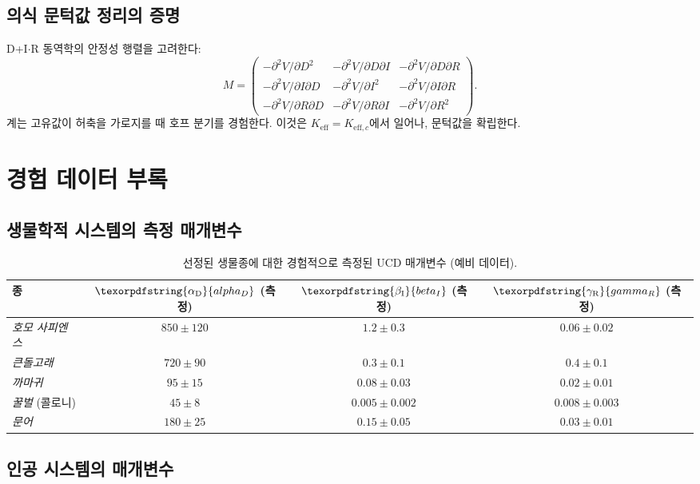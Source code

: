 \documentclass[11pt,a4paper]{article}
\DeclareRobustCommand{\alD}{\texorpdfstring{\ensuremath{\alpha_{\mathrm{D}}}}{alpha_D}}
\DeclareRobustCommand{\beI}{\texorpdfstring{\ensuremath{\beta_{\mathrm{I}}}}{beta_I}}
\DeclareRobustCommand{\gaR}{\texorpdfstring{\ensuremath{\gamma_{\mathrm{R}}}}{gamma_R}}
\newcommand{\eff}{\mathrm{eff}}
\newcommand{\Ke}{K_{\eff}}
\newcommand{\Kec}{K_{\eff,c}}
\begin{document}
	\subsection{의식 문턱값 정리의 증명}
	
	D+I\(\cdot\)R 동역학의 안정성 행렬을 고려한다:
	\[
	M = \begin{pmatrix}
		-\partial^2 V/\partial D^2 & -\partial^2 V/\partial D\partial I & -\partial^2 V/\partial D\partial R \\
		-\partial^2 V/\partial I\partial D & -\partial^2 V/\partial I^2 & -\partial^2 V/\partial I\partial R \\
		-\partial^2 V/\partial R\partial D & -\partial^2 V/\partial R\partial I & -\partial^2 V/\partial R^2
	\end{pmatrix}.
	\]
	계는 고유값이 허축을 가로지를 때 호프 분기를 경험한다. 이것은 \(\Ke = \Kec\)에서 일어나, 문턱값을 확립한다.
	
	\section{경험 데이터 부록}
	
	\subsection{생물학적 시스템의 측정 매개변수}
	
	\begin{table}[ht]
		\centering
		\begin{tabular}{lccc}
			\toprule
			\textbf{종} & \(\alD\) (측정) & \(\beI\) (측정) & \(\gaR\) (측정) \\
			\midrule
			\textit{호모 사피엔스} & \(850 \pm 120\) & \(1.2 \pm 0.3\) & \(0.06 \pm 0.02\) \\
			\textit{큰돌고래} & \(720 \pm 90\) & \(0.3 \pm 0.1\) & \(0.4 \pm 0.1\) \\
			\textit{까마귀} & \(95 \pm 15\) & \(0.08 \pm 0.03\) & \(0.02 \pm 0.01\) \\
			\textit{꿀벌} (콜로니) & \(45 \pm 8\) & \(0.005 \pm 0.002\) & \(0.008 \pm 0.003\) \\
			\textit{문어} & \(180 \pm 25\) & \(0.15 \pm 0.05\) & \(0.03 \pm 0.01\) \\
			\bottomrule
		\end{tabular}
		\caption{선정된 생물종에 대한 경험적으로 측정된 UCD 매개변수 (예비 데이터).}
		\label{tab:bio-measurements}
	\end{table}
	
	\subsection{인공 시스템의 매개변수}
	
\end{document}

